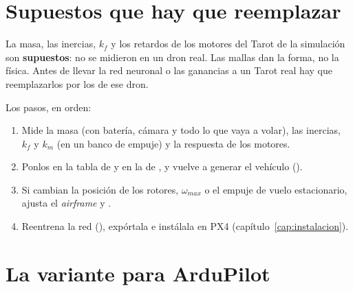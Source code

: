 \section{Supuestos que hay que reemplazar}

\begin{aviso}
La masa, las inercias, $k_f$ y los retardos de los motores del Tarot de la simulación son
\textbf{supuestos}: no se midieron en un dron real. Las mallas dan la forma, no la física. Antes de
llevar la red neuronal o las ganancias a un Tarot real hay que reemplazarlos por los de ese dron.
\end{aviso}

Los pasos, en orden:
\begin{enumerate}
  \item Mide la masa (con batería, cámara y todo lo que vaya a volar), las inercias, $k_f$ y $k_m$ (en
        un banco de empuje) y la respuesta de los motores.
  \item Ponlos en la tabla  de 
        y en la de , y vuelve a generar el vehículo
        ().
  \item Si cambian la posición de los rotores, $\omega_{max}$ o el empuje de vuelo estacionario, ajusta el
        \emph{airframe}  y .
  \item Reentrena la red (), expórtala e
        instálala en PX4 (capítulo~\ref{cap:instalacion}).
\end{enumerate}

\section{La variante para ArduPilot}

